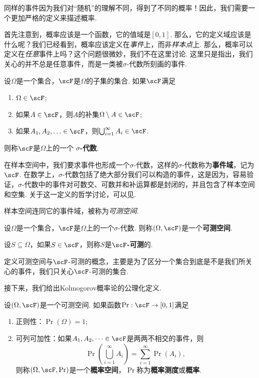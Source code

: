 同样的事件因为我们对“随机”的理解不同，得到了不同的概率！因此，我们需要一个更加严格的定义来描述概率. 

首先注意到，概率应该是一个函数，它的值域是$[0,1]$. 那么，它的定义域应该是什么呢？我们已经看到，概率应该定义在\emph{事件}上，而非\emph{样本点}上. 那么，概率可以定义在\emph{任意}事件上吗？这个问题很微妙，我们不在这里讨论. 这里只是指出，我们关心的并不总是任意事件，而是一类被$\sigma$-代数所刻画的事件. 

\begin{definition}[$\sigma$-代数]
设$\Omega$是一个集合，$\scF$是$\Omega$的子集的集合. 如果$\scF$满足
\begin{enumerate}
    \item $\Omega\in\scF$;
    \item 如果$A\in\scF$，则$A$的补集$\Omega\setminus A\in\scF$;
    \item 如果$A_1,A_2,\ldots\in\scF$，则$\bigcup_{i=1}^\infty A_i\in\scF$.
\end{enumerate}
则称$\scF$是$\Omega$上的一个 \textbf{$\sigma$-代数}. 
\end{definition}


在样本空间中，我们要求事件也形成一个$\sigma$-代数，这样的$\sigma$-代数称为\textbf{事件域}，记为$\scF$. 在数学上，$\sigma$-代数包括了绝大部分我们可以构造的事件，这是因为，容易验证，$\sigma$-代数中的事件对可数交、可数并和补运算都是封闭的，并且包含了样本空间和空集. 关于这一定义的哲学讨论，可以见.  

样本空间连同它的事件域，被称为\emph{可测空间}. 

\begin{definition}[可测空间] 
设$\Omega$是一个集合，$\scF$是$\Omega$上的一个$\sigma$-代数. 则称$(\Omega,\scF)$是一个\textbf{可测空间}.

设$S\subseteq\Omega$，如果$S\in\scF$，则称$S$是\textbf{$\scF$-可测}的.
\end{definition}

定义可测空间与$\scF$-可测的概念，主要是为了区分一个集合到底是不是我们所关心的事件，我们只关心$\scF$-可测的集合.

接下来，我们给出Kolmogorov概率论的公理化定义. 

\begin{definition}
设$(\Omega,\scF)$是一个可测空间. 如果函数$\Pr:\scF\to[0,1]$满足
\begin{enumerate}
    \item 正则性：$\Pr(\Omega)=1$;
    \item 可列可加性：如果$A_1,A_2,\dots\in\scF$是两两不相交的事件，则
    \[
        \Pr\left(\bigcup_{i=1}^\infty A_i\right) = \sum_{i=1}^\infty \Pr(A_i),
    \]
    则称$(\Omega,\scF,\Pr)$是一个\textbf{概率空间}，$\Pr$称为\textbf{概率测度}或\textbf{概率}. 
\end{enumerate}
\end{definition}

